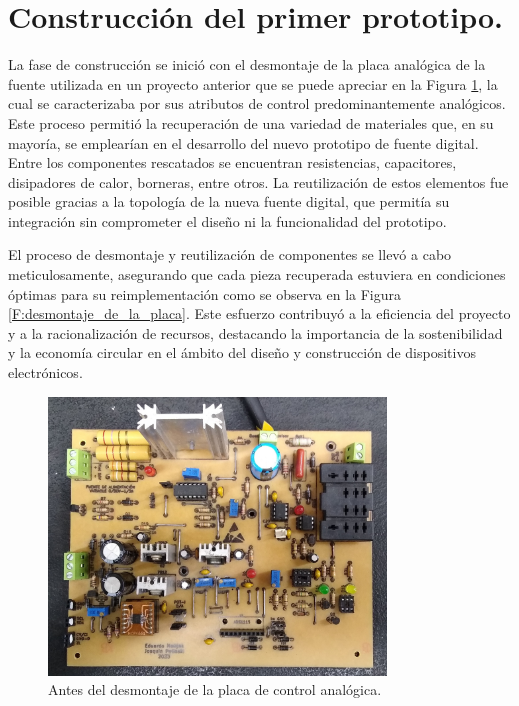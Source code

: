 \section{Construcción del primer prototipo.}
La fase de construcción se inició con el desmontaje de la placa analógica de la fuente utilizada en un proyecto anterior que se puede apreciar en la Figura \ref{F:placa_original}, la cual se caracterizaba por sus atributos de control predominantemente analógicos. Este proceso permitió la recuperación de una variedad de materiales que, en su mayoría, se emplearían en el desarrollo del nuevo prototipo de fuente digital. Entre los componentes rescatados se encuentran resistencias, capacitores, disipadores de calor, borneras, entre otros. La reutilización de estos elementos fue posible gracias a la topología de la nueva fuente digital, que permitía su integración sin comprometer el diseño ni la funcionalidad del prototipo.  \par 
El proceso de desmontaje y reutilización de componentes se llevó a cabo meticulosamente, asegurando que cada pieza recuperada estuviera en condiciones óptimas para su reimplementación como se observa en la Figura \ref{F:desmontaje_de_la_placa}. Este esfuerzo contribuyó a la eficiencia del proyecto y a la racionalización de recursos, destacando la importancia de la sostenibilidad y la economía circular en el ámbito del diseño y construcción de dispositivos electrónicos.
\begin{figure}[H]
    \centering
    \includegraphics[width=0.8\textwidth]{./imagenes/fotos/placa_original.jpg}
    \caption{Antes del desmontaje de la placa de control analógica.}
    \label{F:placa_original}
\end{figure}

